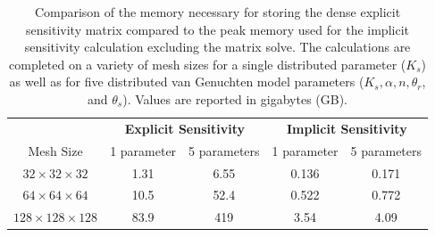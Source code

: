 \documentclass[preprint,review,3p,times,onecolumn,authoryear]{elsarticle}
\begin{document}
\begin{table}[!ht]
\centering
\caption{Comparison of the memory necessary for storing the dense explicit sensitivity matrix compared to the peak memory used for the implicit sensitivity calculation excluding the matrix solve. The calculations are completed on a variety of mesh sizes for a single distributed parameter ($K_s$) as well as for five distributed van Genuchten model parameters ($K_s, \alpha, n, \theta_r$, and $\theta_s$). Values are reported in gigabytes (GB).}
\begin{tabular}{*{5}c}
\hline
 &   \multicolumn{2}{c}{\bf Explicit Sensitivity} &    \multicolumn{2}{c}{\bf Implicit Sensitivity}  \\
Mesh Size & 1 parameter & 5 parameters & 1 parameter & 5 parameters  \\
\hline
$32 \times 32 \times 32$    & 1.31 &  6.55 &  0.136 & 0.171\\
$64 \times 64 \times 64$    & 10.5 &  52.4 &  0.522 & 0.772\\
$128 \times 128 \times 128$ & 83.9 &  419  &  3.54  & 4.09 \\
\hline
\end{tabular}
\label{table:richards-sensitivity}
\end{table}




\end{document}
